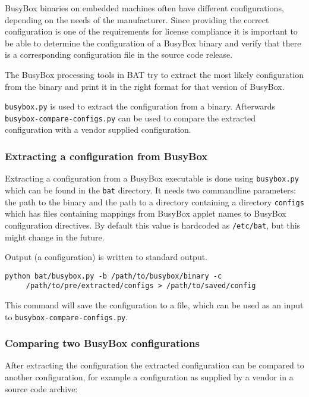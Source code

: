 \documentclass[10pt,a4paper]{article}
\begin{document}
BusyBox binaries on embedded machines often have different configurations,
depending on the needs of the manufacturer. Since providing the correct
configuration is one of the requirements for license compliance it is important
to be able to determine the configuration of a BusyBox binary and verify that
there is a corresponding configuration file in the source code release.

The BusyBox processing tools in BAT try to extract the most likely
configuration from the binary and print it in the right format for that version
of BusyBox.

\texttt{busybox.py} is used to extract the configuration from a binary.
Afterwards \texttt{busybox-compare-configs.py} can be used to compare the
extracted configuration with a vendor supplied configuration.

\subsubsection{Extracting a configuration from BusyBox}

Extracting a configuration from a BusyBox executable is done using
\texttt{busybox.py} which can be found in the \texttt{bat} directory. It needs
two commandline parameters: the path to the binary and the path to a directory
containing a directory \texttt{configs} which has files containing mappings
from BusyBox applet names to BusyBox configuration directives. By default this
value is hardcoded as \texttt{/etc/bat}, but this might change in the future.

Output (a configuration) is written to standard output.

\begin{verbatim}
python bat/busybox.py -b /path/to/busybox/binary -c
     /path/to/pre/extracted/configs > /path/to/saved/config
\end{verbatim}

This command will save the configuration to a file, which can be used as an
input to \texttt{busybox-compare-configs.py}.

\subsubsection{Comparing two BusyBox configurations}

After extracting the configuration the extracted configuration can be compared
to another configuration, for example a configuration as supplied by a vendor
in a source code archive:
\end{document}
